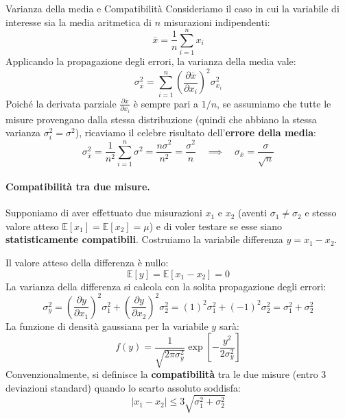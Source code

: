 \documentclass[openany,a4paper,12pt]{book}
\theoremstyle{remark}
\begin{document}
\begin{bressan}{Varianza della media e Compatibilità}
Consideriamo il caso in cui la variabile di interesse sia la media aritmetica di $n$ misurazioni indipendenti:
\begin{equation}
    \overline{x} = \frac{1}{n}\sum_{i=1}^n x_i
\end{equation}
Applicando la propagazione degli errori, la varianza della media vale:
\begin{equation}
    \sigma_{\overline{x}}^2 = \sum_{i=1}^n \left(\frac{\partial \overline{x}}{\partial x_i}\right)^2 \sigma_{x_i}^2
\end{equation}
Poiché la derivata parziale $\frac{\partial \overline{x}}{\partial x_i}$ è sempre pari a $1/n$, se assumiamo che tutte le misure provengano dalla stessa distribuzione (quindi che abbiano la stessa varianza $\sigma_i^2 = \sigma^2$), ricaviamo il celebre risultato dell'\textbf{errore della media}:
\begin{equation}
    \sigma_{\overline{x}}^2 = \frac{1}{n^2} \sum_{i=1}^n \sigma^2 = \frac{n\sigma^2}{n^2} = \frac{\sigma^2}{n} \quad \implies \quad \sigma_{\overline{x}} = \frac{\sigma}{\sqrt{n}}
\end{equation}

\paragraph{Compatibilità tra due misure.} 
Supponiamo di aver effettuato due misurazioni $x_1$ e $x_2$ (aventi $\sigma_1 \neq \sigma_2$ e stesso valore atteso $\mathbb{E}[x_1] = \mathbb{E}[x_2] = \mu$) e di voler testare se esse siano \textbf{statisticamente compatibili}. Costruiamo la variabile differenza $y = x_1 - x_2$.

Il valore atteso della differenza è nullo:
\begin{equation}
    \mathbb{E}[y] = \mathbb{E}[x_1 - x_2] = 0
\end{equation}   
La varianza della differenza si calcola con la solita propagazione degli errori:
\begin{equation}
    \sigma_y^2 = \left(\frac{\partial y}{\partial x_1}\right)^2 \sigma_1^2 + \left(\frac{\partial y}{\partial x_2}\right)^2 \sigma_2^2 = (1)^2\sigma_1^2 + (-1)^2\sigma_2^2 = \sigma_1^2 + \sigma_2^2
\end{equation}
La funzione di densità gaussiana per la variabile $y$ sarà:
\begin{equation}
    f(y) = \frac{1}{\sqrt{2\pi \sigma_y^2}}\exp\left[-\frac{y^2}{2\sigma_y^2}\right]
\end{equation}
Convenzionalmente, si definisce la \textbf{compatibilità} tra le due misure (entro 3 deviazioni standard) quando lo scarto assoluto soddisfa:
\begin{equation}
    \left| x_1 - x_2 \right| \leq 3\sqrt{\sigma_1^2 + \sigma_2^2}
\end{equation}
\end{bressan}
\end{document}
